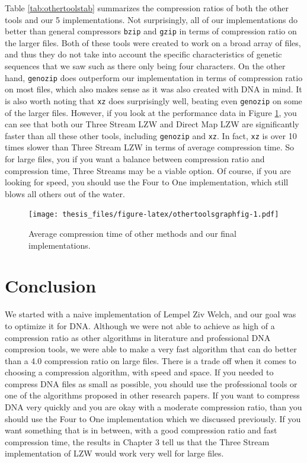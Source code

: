 \documentclass[12pt,twoside]{reedthesis}
\begin{document}
Table \ref{tab:othertoolstab} summarizes the compression ratios of both the other tools and our 5 implementations. Not surprisingly, all of our implementations do better than general compressors \texttt{bzip} and \texttt{gzip} in terms of compression ratio on the larger files. Both of these tools were created to work on a broad array of files, and thus they do not take into account the specific characteristics of genetic sequences that we saw such as there only being four characters. On the other hand, \texttt{genozip} does outperform our implementation in terms of compression ratio on most files, which also makes sense as it was also created with DNA in mind. It is also worth noting that \texttt{xz} does surprisingly well, beating even \texttt{genozip} on some of the larger files. However, if you look at the performance data in Figure \ref{fig:othertoolsgraphfig}, you can see that both our Three Stream LZW and Direct Map LZW are significantly faster than all these other tools, including \texttt{genozip} and \texttt{xz}. In fact, \texttt{xz} is over 10 times slower than Three Stream LZW in terms of average compression time. So for large files, you if you want a balance between compression ratio and compression time, Three Streams may be a viable option. Of course, if you are looking for speed, you should use the Four to One implementation, which still blows all others out of the water.
\begin{figure}
\centering
\texttt{[image: thesis\_files/figure-latex/othertoolsgraphfig-1.pdf]}
\caption{\label{fig:othertoolsgraphfig}Average compression time of other methods and our final implementations.}
\end{figure}
\hypertarget{conclusion}{%
\chapter*{Conclusion}\label{conclusion}}

We started with a naive implementation of Lempel Ziv Welch, and our goal was to optimize it for DNA. Although we were not able to achieve as high of a compression ratio as other algorithms in literature and professional DNA compresion tools, we were able to make a very fast algorithm that can do better than a 4.0 compression ratio on large files. There is a trade off when it comes to choosing a compression algorithm, with speed and space. If you needed to compress DNA files as small as possible, you should use the professional tools or one of the algorithms proposed in other research papers. If you want to compress DNA very quickly and you are okay with a moderate compression ratio, than you should use the Four to One implementation which we discussed previously. If you want something that is in between, with a good compression ratio and fast compression time, the results in Chapter 3 tell us that the Three Stream implementation of LZW would work very well for large files.
\end{document}
